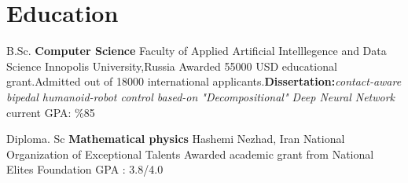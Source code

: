 \section{Education}
            {B.Sc. \textbf{Computer Science}}
            {Faculty of Applied Artificial Intelllegence and Data Science}
            {Innopolis University,Russia}
            {Awarded 55000 USD educational grant.Admitted out of 18000 international applicants.\textbf{Dissertation:}\textit{contact-aware bipedal humanoid-robot control based-on "Decompositional" Deep Neural Network} }
            {current GPA: \%85} 
  
    \vspace{10pt}
    
            {Diploma. Sc \textbf{Mathematical physics}}
            {Hashemi Nezhad, Iran}
            {National Organization of Exceptional Talents}
            {Awarded academic grant from National Elites Foundation }
            {GPA : 3.8/4.0}
